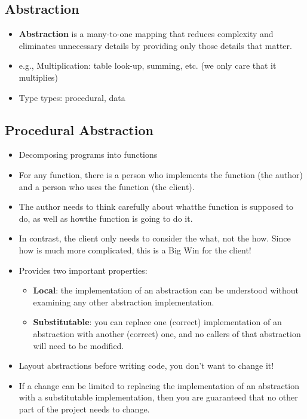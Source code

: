 \subsection{Abstraction}
\begin{itemize}
	\item \textbf{Abstraction} is a many-to-one mapping that reduces complexity and eliminates unnecessary details by providing only those details that matter.
	\item e.g., Multiplication: table look-up, summing, etc. (we only care that it multiplies)
	\item Type types: procedural, data
\end{itemize}

\subsection{Procedural Abstraction}
\begin{itemize}
	\item Decomposing programs into functions
	\item For any function, there is a person who implements the function (the author) and a person who uses the function (the client).
	\item The author needs to think carefully about whatthe function is supposed to do, as well as howthe function is going to do it.
	\item In contrast, the client only needs to consider the what, not the how. Since how is much more complicated, this is a Big Win for the client!
	\item Provides two important properties:
	\begin{itemize}
		\item \textbf{Local}: the implementation of an abstraction can be understood without examining any other abstraction implementation.
		\item \textbf{Substitutable}: you can replace one (correct) implementation of an abstraction with another (correct) one, and no callers of that abstraction will need to be modified.
	\end{itemize}
	\item Layout abstractions before writing code, you don't want to change it!
	\item If a change can be limited to replacing the implementation of an abstraction with a substitutable implementation, then you are guaranteed that no other part of the project needs to change.
\end{itemize}

